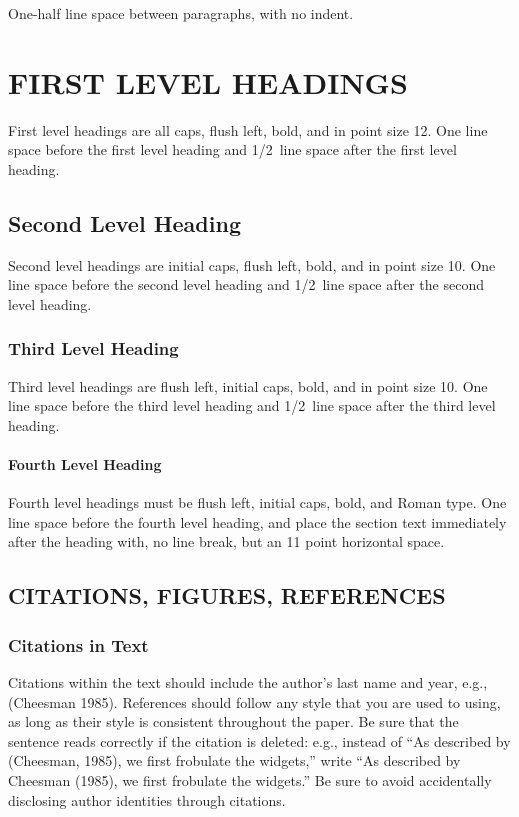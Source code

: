 \documentclass[twoside]{article}
\begin{document}
One-half line space between paragraphs, with no indent.

\section{FIRST LEVEL HEADINGS}

First level headings are all caps, flush left, bold, and in point size
12. One line space before the first level heading and 1/2~line space
after the first level heading.

\subsection{Second Level Heading}

Second level headings are initial caps, flush left, bold, and in point
size 10. One line space before the second level heading and 1/2~line
space after the second level heading.

\subsubsection{Third Level Heading}

Third level headings are flush left, initial caps, bold, and in point
size 10. One line space before the third level heading and 1/2~line
space after the third level heading.

\paragraph{Fourth Level Heading}

Fourth level headings must be flush left, initial caps, bold, and
Roman type.  One line space before the fourth level heading, and
place the section text immediately after the heading with, no line
break, but an 11 point horizontal space.

\subsection{CITATIONS, FIGURES, REFERENCES}


\subsubsection{Citations in Text}

Citations within the text should include the author's last name and
year, e.g., (Cheesman 1985). References should follow any style that
you are used to using, as long as their style is consistent throughout
the paper.  Be sure that the sentence reads correctly if the citation
is deleted: e.g., instead of ``As described by (Cheesman, 1985), we
first frobulate the widgets,'' write ``As described by Cheesman
(1985), we first frobulate the widgets.''  Be sure to avoid
accidentally disclosing author identities through citations.
\end{document}
